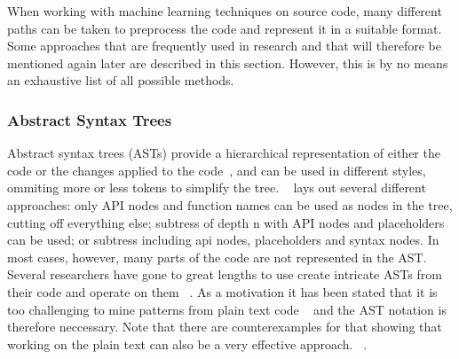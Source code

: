 \documentclass[
	a4paper,
	pagesize,
	pdftex,
	12pt,
	twoside, %
	BCOR=5mm, %
	ngerman,
	fleqn,
	final,
	]{scrartcl}
\begin{document}
When working with machine learning techniques on source code, many different paths can be taken to preprocess the code and represent it in a suitable format. Some approaches that are frequently used in research and that will therefore be mentioned again later are described in this section. However, this is by no means an exhaustive list of all possible methods. 

\subsubsection{Abstract Syntax Trees}
Abstract syntax trees (ASTs) provide a hierarchical representation of either the code or the changes applied to the code~\cite{Liu.2018}, and can be used in different styles, ommiting more or less tokens to simplify the tree. ~\cite{Yamaguchi.2012} lays out several different approaches: only API nodes and function names can be used as nodes in the tree, cutting off everything else; subtress of depth n with API nodes and placeholders can be used; or subtress including api nodes, placeholders and syntax nodes. In most cases, however, many parts of the code are not represented in the AST.\\ Several researchers have gone to great lengths to use create intricate ASTs from their code and operate on them ~\cite{Ma.2017,Yamaguchi.2012}. As a motivation it has been stated that it is too challenging to mine patterns from plain text code ~\cite{Liu.2018} and the AST notation is therefore neccessary. Note that there are counterexamples for that showing that working on the plain text can also be a very effective approach. ~\cite{Russell.2018,Hovsepyan.2012}.\\
\end{document}
